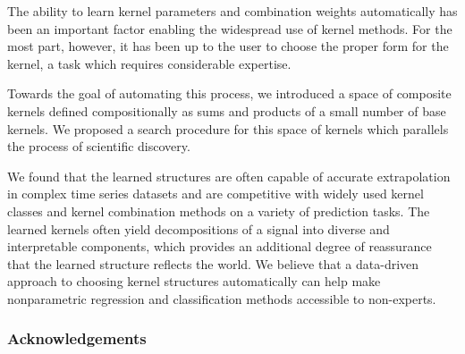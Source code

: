 \documentclass[twoside]{article}
\begin{document}
The ability to learn kernel parameters and combination weights automatically has been an important factor enabling the widespread use of kernel methods.
For the most part, however, it has been up to the user to choose the proper form for the kernel, a task which requires considerable expertise.

Towards the goal of automating this process, we introduced a space of composite kernels defined compositionally as sums and products of a small number of base kernels.
We proposed a search procedure for this space of kernels which parallels the process of scientific discovery.

We found that the learned structures are often capable of accurate extrapolation in complex time series datasets and are competitive with widely used kernel classes and kernel combination methods on a variety of prediction tasks.
The learned kernels often yield decompositions of a signal into diverse and interpretable components, which provides an additional degree of reassurance that the learned structure reflects the world.
We believe that a data-driven approach to choosing kernel structures automatically can help make nonparametric regression and classification methods accessible to non-experts.

\subsubsection*{Acknowledgements}



\end{document}
